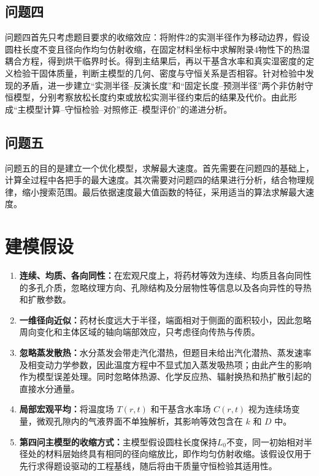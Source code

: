 \documentclass[withoutpreface,bwprint]{cumcmthesis}
\begin{document}
\subsection{问题四}
问题四首先只考虑题目要求的收缩效应：将附件2的实测半径作为移动边界，假设圆柱长度不变且径向作均匀仿射收缩，在固定材料坐标中求解附录4物性下的热湿耦合方程，得到烘干临界时长。得到主结果后，再以干基含水率和真实湿密度的定义检验干固体质量，判断主模型的几何、密度与守恒关系是否相容。针对检验中发现的矛盾，进一步建立“实测半径--反演长度”和“固定长度--预测半径”两个非仿射守恒模型，分别考察放松长度约束或放松实测半径约束后的结果及代价。由此形成“主模型计算--守恒检验--对照修正--模型评价”的递进分析。

\subsection{问题五}
问题五的目的是建立一个优化模型，求解最大速度。首先需要在问题四的基础上，计算全过程中各把手的最大速度。其次需要对问题四的结果进行分析，结合物理规律，缩小搜索范围。最后依据速度最大值函数的特征，采用适当的算法求解最大速度。

\section{建模假设}
\begin{enumerate}[label=\arabic*.,leftmargin=2em,itemsep=0pt,topsep=0pt]
  \item \textbf{连续、均质、各向同性：}在宏观尺度上，将药材等效为连续、均质且各向同性的多孔介质，忽略纹理方向、孔隙结构及分层物性等信息以及各向异性的导热和扩散参数。
  \item \textbf{一维径向近似：}药材长度远大于半径，端面相对于侧面的面积较小，因此忽略周向变化和主体区域的轴向端部效应，只考虑径向传热与传质。
  \item \textbf{忽略蒸发散热：}水分蒸发会带走汽化潜热，但题目未给出汽化潜热、蒸发速率及相变动力学参数，因此温度方程中不显式加入蒸发吸热项；由此产生的影响作为模型误差处理。同时忽略体热源、化学反应热、辐射换热和热扩散引起的直接水分通量。
  \item \textbf{局部宏观平均：}将温度场 $T(r,t)$ 和干基含水率场 $C(r,t)$ 视为连续场变量，微观孔隙内的气液界面不单独解析，其影响等效包含在 $k$ 和 $D$ 中。
  \item \textbf{第四问主模型的收缩方式：}主模型假设圆柱长度保持$L_0$不变，同一初始相对半径处的材料层始终具有相同的径向缩放比，即作均匀仿射收缩。该假设仅用于先行求得题设驱动的工程基线，随后将由干质量守恒检验其适用性。

\end{enumerate}
\end{document}

